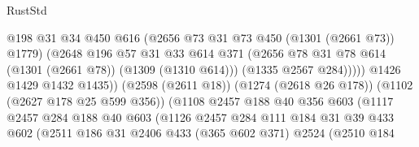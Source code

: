 \begin{lexlean}{RustStd}
\begin{coremodule}
                                        @198
                                        @31
                                        @34
                                        @450
                                        @616
                                        (@2656 @73 @31 @73 @450 (@1301 (@2661 @73)) @1779)
                                        (@2648
                                          @196
                                          @57
                                          @31
                                          @33
                                          @614
                                          @371
                                          (@2656
                                            @78
                                            @31
                                            @78
                                            @614
                                            (@1301 (@2661 @78))
                                            (@1309 (@1310 @614)))
                                          (@1335 @2567 @284)))))
                                  @1426
                                  @1429
                                  @1432
                                  @1435))
                              (@2598 (@2611 @18))
                              (@1274 (@2618 @26 @178))
                              (@1102 (@2627 @178 @25 @599 @356))
                              (@1108
                                @2457
                                @188
                                @40
                                @356
                                @603
                                (@1117
                                  @2457
                                  @284
                                  @188
                                  @40
                                  @603
                                  (@1126
                                    @2457
                                    @284
                                    @111
                                    @184
                                    @31
                                    @39
                                    @433
                                    @602
                                    (@2511
                                      @186
                                      @31
                                      @2406
                                      @433
                                      (@365 @602 @371)
                                      @2524
                                      (@2510
                                        @184

\end{coremodule}
\end{lexlean}
